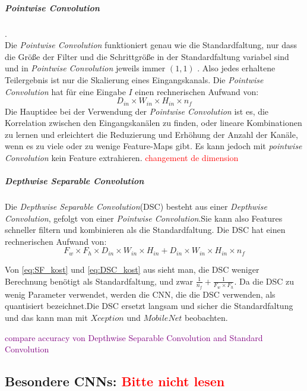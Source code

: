 \documentclass[12pt,a4paper]{scrartcl}
\numberwithin{equation}{section}
\begin{document}
\subparagraph{Pointwise Convolution}.\\
Die \textit{Pointwise Convolution} funktioniert genau wie die Standardfaltung, nur dass die Größe der Filter und die Schrittgröße in der Standardfaltung variabel sind und in \textit{Pointwise Convolution} jeweils immer $ (1,1) $ . Also jedes erhaltene Teilergebnis ist nur die Skalierung eines Eingangskanals. Die \textit{Pointwise Convolution} hat für eine Eingabe $ I $ einen rechnerischen Aufwand von:
\begin{equation}\label{eq:PT_kost}
	 D_{in}\times W_{in}\times H_{in} \times n_f
\end{equation}
Die Hauptidee bei der Verwendung der \textit{Pointwise Convolution} ist es, die Korrelation zwischen den Eingangskanälen zu finden, oder lineare Kombinationen zu lernen und erleichtert die Reduzierung und Erhöhung der Anzahl der Kanäle, wenn es zu viele oder zu wenige Feature-Maps gibt. Es kann jedoch mit \textit{pointwise Convolution} kein Feature extrahieren.
\textcolor{red}{changement de dimension}
\subparagraph{Depthwise Separable Convolution}
Die \textit{Depthwise Separable Convolution}(DSC) besteht aus einer \textit{Depthwise Convolution}, gefolgt von einer \textit{Pointwise Convolution}.Sie kann also Features schneller filtern und kombinieren als die Standardfaltung. Die DSC hat einen rechnerischen Aufwand von:
\begin{equation}\label{eq:DSC_kost}
F_w\times F_h \times D_{in}\times W_{in}\times H_{in} + D_{in}\times W_{in}\times H_{in} \times n_f
\end{equation}

Von \ref{eq:SF_kost} und \ref{eq:DSC_kost} aus sieht man, die DSC weniger Berechnung benötigt als Standardfaltung, und zwar $ \frac{1}{n_f} + \frac{1}{F_w\times F_h}$. Da die DSC zu wenig Parameter verwendet, werden die \ac{CNN}, die die DSC verwenden, als quantisiert bezeichnet.Die DSC ersetzt langsam und sicher die Standardfaltung und das kann man mit $ Xception $ und $ MobileNet $ beobachten.

\textcolor{purple}{compare accuracy von Depthwise Separable Convolution and Standard Convolution}
\subsection{ Besondere \acsp{CNN}: \textcolor{red}{Bitte nicht lesen}}
\end{document}
